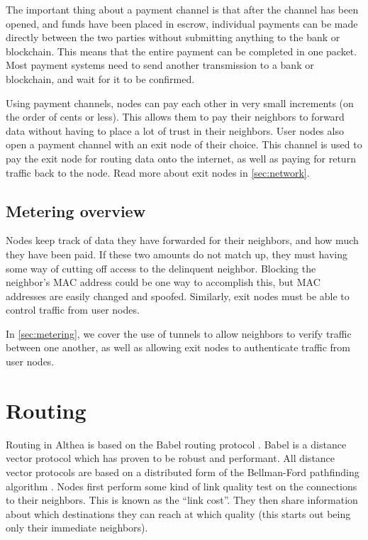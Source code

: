 \documentclass[11pt]{article}
\begin{document}
The important thing about a payment channel is that after the channel has been opened, and funds have been placed in escrow, individual payments can be made directly between the two parties without submitting anything to the bank or blockchain. This means that the entire payment can be completed in one packet. Most payment systems need to send another transmission to a bank or blockchain, and wait for it to be confirmed. 
 
Using payment channels, nodes can pay each other in very small increments (on the order of cents or less). This allows them to pay their neighbors to forward data without having to place a lot of trust in their neighbors. User nodes also open a payment channel with an exit node of their choice. This channel is used to pay the exit node for routing data onto the internet, as well as paying for return traffic back to the node. Read more about exit nodes in \autoref{sec:network}.

\subsection{Metering overview}
Nodes keep track of data they have forwarded for their neighbors, and how much they have been paid. If these two amounts do not match up, they must having some way of cutting off access to the delinquent neighbor. Blocking the neighbor’s MAC address could be one way to accomplish this, but MAC addresses are easily changed and spoofed. Similarly, exit nodes must be able to control traffic from user nodes.
 
In \autoref{sec:metering}, we cover the use of tunnels to allow neighbors to verify traffic between one another, as well as allowing exit nodes to authenticate traffic from user nodes.

\section{Routing}
\label{sec:routing}
Routing in Althea is based on the Babel routing protocol \cite{babel}. Babel is a distance vector protocol which has proven to be robust and performant. All distance vector protocols are based on a distributed form of the Bellman-Ford pathfinding algorithm \cite{bellmanford}. Nodes first perform some kind of link quality test on the connections to their neighbors. This is known as the ``link cost''. They then share information about which destinations they can reach at which quality (this starts out being only their immediate neighbors).
 
\end{document}

